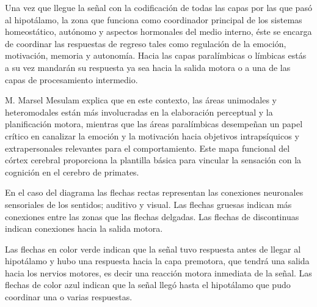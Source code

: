 Una vez que llegue la señal con la codificación de todas las capas por las que pasó al hipotálamo, la zona que funciona como coordinador principal de los sistemas homeostático, autónomo y
aspectos hormonales del medio interno, éste se encarga de coordinar las respuestas de regreso tales como regulación de la emoción, motivación, memoria y autonomía. Hacia las capas paralímbicas o límbicas estás a su vez mandarán su respuesta ya sea hacia la salida motora o a una de las capas de procesamiento intermedio.

M. Marsel Mesulam explica que en este contexto, las áreas unimodales y heteromodales están más involucradas en la elaboración perceptual y la planificación motora, mientras que las áreas paralímbicas desempeñan un papel crítico en canalizar la emoción y la motivación hacia objetivos intrapsíquicos y extrapersonales relevantes para el comportamiento. Este mapa funcional del córtex cerebral proporciona la plantilla básica para vincular la sensación con la cognición en el cerebro de primates.

En el caso del diagrama  las flechas rectas representan las conexiones neuronales sensoriales de los sentidos; auditivo y visual. Las flechas gruesas indican más conexiones entre las zonas que las flechas delgadas. Las flechas de discontinuas indican conexiones hacia la salida motora.

Las flechas en color verde indican que la señal tuvo respuesta antes de llegar al hipotálamo y hubo una respuesta hacia la capa premotora, que tendrá una salida hacia los nervios motores, es decir una reacción motora inmediata de la señal. Las flechas de color azul indican que la señal llegó hasta el hipotálamo que pudo coordinar una o varias respuestas. 

